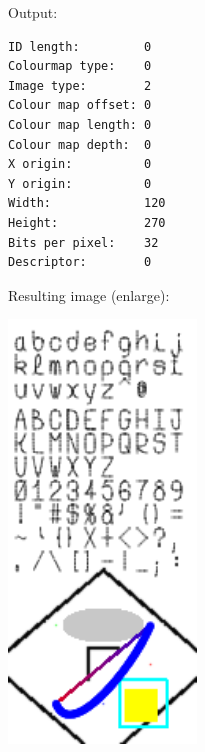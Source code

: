 \documentclass[12pt, a4paper]{article}
\begin{document}
Output:\\
\begin{scriptsize}
\begin{ttfamily}
\begin{lstlisting}
ID length:         0
Colourmap type:    0
Image type:        2
Colour map offset: 0
Colour map length: 0
Colour map depth:  0
X origin:          0
Y origin:          0
Width:             120
Height:            270
Bits per pixel:    32
Descriptor:        0
\end{lstlisting}
\end{ttfamily}
\end{scriptsize}


Resulting image (enlarge):\\
\begin{center}
\includegraphics[width=5cm]{tga.png}
\end{center} 
	
\end{document}
